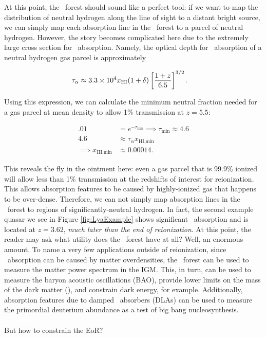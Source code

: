 At this point, the \lya\ forest should sound like a perfect tool: if we want to map the distribution of neutral hydrogen along the line of sight to a distant bright source, we can simply map each absorption line in the \lya\ forest to a parcel of neutral hydrogen. However, the story becomes complicated here due to the extremely large cross section for \lya\ absorption. Namely, the optical depth for \lya\ absorption of a neutral hydrogen gas parcel is approximately

\begin{align}
\tau_{\alpha} &\approx 3.3 \times 10^{4} x_{\text{HI}} (1 + \delta) \left[\dfrac{1+z}{6.5}\right]^{3/2}. \label{eq:tauGP}
\end{align}

Using this expression, we can calculate the minimum neutral fraction needed for a gas parcel at mean density to allow 1\% transmission at $z = 5.5$:

\begin{align}
.01 &= e^{-\tau_{\text{min}}} \implies \tau_{\text{min}} \approx 4.6\\
4.6 &\approx \tau_{\alpha} x_{\text{HI,min}} \\
\implies x_{\text{HI,min}} &\approx 0.00014.
\end{align}


This reveals the fly in the ointment here: even a gas parcel that is 99.9\% ionized will allow less than 1\% transmission at the redshifts of interest for reionization. This allows absorption features to be caused by highly-ionized gas that happens to be over-dense. Therefore, we can not simply map absorption lines in the \lya\ forest to regions of significantly-neutral hydrogen. In fact, the second example quasar we see in Figure \ref{fig:LyaExample} shows significant \lya\ absorption and is located at $z = 3.62$, \textit{much later than the end of reionization}. At this point, the reader may ask what utility does the \lya\ forest have at all? Well, an enormous amount. To name a very few applications outside of reionization, since \lya\ absorption can be caused by matter overdensities, the \lya\ forest can be used to measure the matter power spectrum in the IGM. This, in turn, can be used to measure the baryon acoustic oscillations (BAO), provide lower limits on the mass of the dark matter (\citealt{Viel:2013fqw}), and constrain dark energy, for example. Additionally, absorption features due to damped \lya\ absorbers (DLAs) can be used to measure the primordial deuterium abundance as a test of big bang nucleosynthesis.\\
\textcolor{white}{suspense!}\\
\noindent But how to constrain the EoR?



